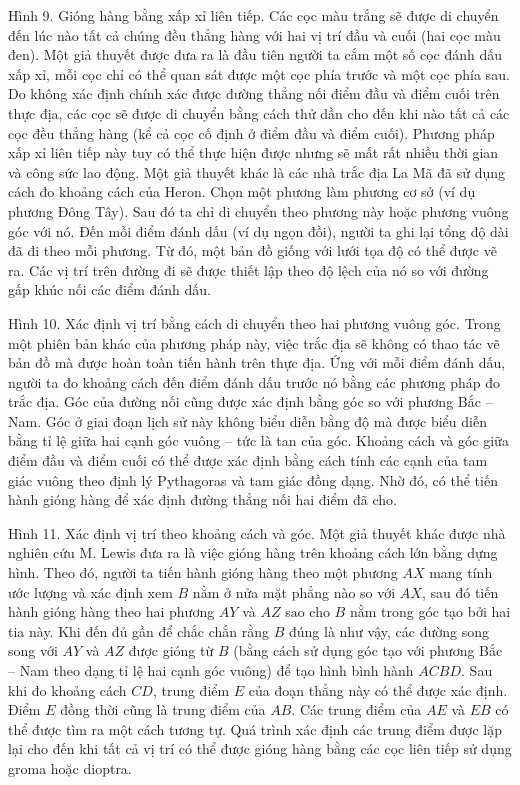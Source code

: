 \begin{multicols}{2}
	Hình 9. Gióng hàng bằng xấp xỉ liên tiếp. Các cọc màu trắng sẽ được di chuyển đến lúc nào tất cả chúng đều thẳng hàng với hai vị trí đầu và cuối (hai cọc màu đen).
	Một giả thuyết được đưa ra là đầu tiên người ta cắm một số cọc đánh dấu xấp xỉ, mỗi cọc chỉ có thể quan sát được một cọc phía trước và một cọc phía sau. Do không xác định chính xác được đường thẳng nối điểm đầu và điểm cuối trên thực địa, các cọc sẽ được di chuyển bằng cách thử dần cho đến khi nào tất cả các cọc đều thẳng hàng (kể cả cọc cố định ở điểm đầu và điểm cuối). Phương pháp xấp xỉ liên tiếp này tuy có thể thực hiện được nhưng sẽ mất rất nhiều thời gian và công sức lao động.
	Một giả thuyết khác là các nhà trắc địa La Mã đã sử dụng cách đo khoảng cách của Heron. Chọn một phương làm phương cơ sở (ví dụ phương Đông Tây). Sau đó ta chỉ di chuyển theo phương này hoặc phương vuông góc với nó. Đến mỗi điểm đánh dấu (ví dụ ngọn đồi), người ta ghi lại tổng độ dài đã đi theo mỗi phương. Từ đó, một bản đồ giống với lưới tọa độ có thể được vẽ ra. Các vị trí trên đường đi sẽ được thiết lập theo độ lệch của nó so với đường gấp khúc nối các điểm đánh dấu.
	
	Hình 10. Xác định vị trí bằng cách di chuyển theo hai phương vuông góc.
	Trong một phiên bản khác của phương pháp này, việc trắc địa sẽ không có thao tác vẽ bản đồ mà được hoàn toàn tiến hành trên thực địa. Ứng với mỗi điểm đánh dấu, người ta đo khoảng cách đến điểm đánh dấu trước nó bằng các phương pháp đo trắc địa. Góc của đường nối cũng được xác định bằng góc so với phương Bắc – Nam. Góc ở giai đoạn lịch sử này không biểu diễn bằng độ mà được biểu diễn bằng tỉ lệ giữa hai cạnh góc vuông – tức là tan của góc. Khoảng cách và góc giữa điểm đầu và điểm cuối có thể được xác định bằng cách tính các cạnh của tam giác vuông theo định lý Pythagoras và tam giác đồng dạng. Nhờ đó, có thể tiến hành gióng hàng để xác định đường thẳng nối hai điểm đã cho.
	
	Hình 11. Xác định vị trí theo khoảng cách và góc.
	Một giả thuyết khác được nhà nghiên cứu M. Lewis đưa ra là việc gióng hàng trên khoảng cách lớn bằng dựng hình. Theo đó, người ta tiến hành gióng hàng theo một phương $AX$ mang tính ước lượng và xác định xem $B$ nằm ở nửa mặt phẳng nào so với $AX$, sau đó tiến hành gióng hàng theo hai phương $AY$ và $AZ$ sao cho $B$ nằm trong góc tạo bởi hai tia này. Khi đến đủ gần để chắc chắn rằng $B$ đúng là như vậy, các đường song song với $AY$ và $AZ$ được gióng từ $B$ (bằng cách sử dụng góc tạo với phương Bắc – Nam theo dạng tỉ lệ hai cạnh góc vuông) để tạo hình bình hành $ACBD$. Sau khi đo khoảng cách $CD$, trung điểm $E$ của đoạn thẳng này có thể được xác định. Điểm $E$ đồng thời cũng là trung điểm của $AB$. Các trung điểm của $AE$ và $EB$ có thể được tìm ra một cách tương tự. Quá trình xác định các trung điểm được lặp lại cho đến khi tất cả vị trí có thể được gióng hàng bằng các cọc liên tiếp sử dụng groma hoặc dioptra. 
	

\end{multicols}
